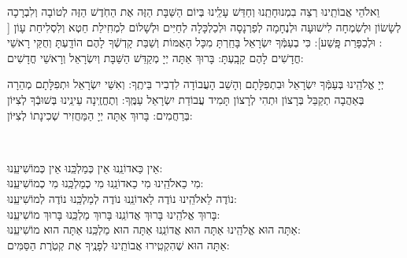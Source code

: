 \documentclass[twoside, openany, parskip=half, 11pt]{book}
\begin{document}
\begin{sometimes}
 וֵאלֹהֵי אֲבוֹתֵֽינוּ רְצֵה בִמְנוּחָתֵֽנוּ וְחַדֵּשׁ עָלֵֽינוּ בְּיוֹם הַשַּׁבָּת הַזֶּה אֶת הַחֹֽדֶשׁ הַזֶּה לְטוֹבָה וְלִבְרָכָה לְשָׂשׂוֹן וּלְשִׂמְחָה לִישׁוּעָה וּלְנֶחָמָה לְפַרְנָסָה וּלְכַלְכָּלָה לְחַיִּים וּלְשָׁלוֹם לִמְחִֽילַת חֵטְא וְלִסְלִיחַת עָוֹן [
: וּלְכַפָּרַת פָּֽשַׁע]: כִּי בְעַמְּֿךָ יִשְׂרָאֵל בָּחַֽרְתָּ מִכָּל הָאֻמּוֹת וְשַׁבַּת קָדְשְֿׁךָ לָהֶם הוֹדָֽעְתָּ וְחֻקֵּי רָאשֵׁי חֳדָשִׁים לָהֶם קָבָֽעְתָּ: בָּרוּךְ אַתָּה יְיָ מְקַדֵּשׁ הַשַּׁבָּת וְיִשְׂרָאֵל וְרָאשֵׁי חֳדָשִׁים: 

\end{sometimes}

 יְיָ אֱלֹהֵֽינוּ בְּעַמְּֿךָ יִשְׂרָאֵל וּבִתְפִלָּתָם וְהָשֵׁב הָעֲבוֹדָה לִדְבִיר בֵּיתֶֽךָ: וְאִשֵּׁי יִשְׂרָאֵל וּתְפִלָּתָם מְהֵרָה בְּאַהֲבָה תְקַבֵּל בְּרָצוֹן וּתְהִי לְרָצוֹן תָּמִיד עֲבוֹדַת יִשְׂרָאֵל עַמֶּֽךָ: וְתֶחֱזֶֽינָה עֵינֵֽינוּ בְּשׁוּבְֿךָ לְצִיּוֹן בְּרַחֲמִים: 
בָּרוּךְ אַתָּה יְיָ הַמַּחֲזִיר שְׁכִינָתוֹ לְצִיּוֹן:

\modim

\clearpage

\shabboschanukah

\shabboshodos

\bircaskohanim

\shabbossimshalom


\tachanunim

 \pageref{hoshanos}\\

\fullkaddish



\label{einkelokeinu}
 \hfill אֵין כַּאדוֹנֵֽנוּ \hfill אֵין כְּמַלְכֵּֽנוּ \hfill אֵין כְּמוֹשִׁיעֵֽנוּ:\\ 
מִי כֵאלֹהֵֽינוּ \hfill	מִי כַאדוֹנֵֽנוּ \hfill	מִי כְמַלְכֵּֽנוּ \hfill	מִי כְמוֹשִׁיעֵֽנוּ:\\ 
נוֹדֶה לֵאלֹהֵֽינוּ \hfill נוֹדֶה לַאדוֹנֵֽנוּ \hfill נוֹדֶה לְמַלְכֵּֽנוּ \hfill נוֹדֶה לְמוֹשִׁיעֵֽנוּ:\\ 
בָּרוּךְ אֱלֹהֵֽינוּ \hfill בָּרוּךְ אֲדוֹנֵֽנוּ \hfill בָּרוּךְ מַלְכֵּֽנוּ \hfill בָּרוּךְ מוֹשִׁיעֵֽנוּ:\\ 
אַתָּה הוּא אֱלֹהֵֽינוּ  אַתָּה הוּא אֲדוֹנֵֽנוּ  אַתָּה הוּא מַלְכֵּֽנוּ  אַתָּה הוּא מוֹשִׁיעֵֽנוּ:\\ 
 אַתָּה הוּא שֶׁהִקְטִֽירוּ אֲבוֹתֵֽינוּ לְפָנֶֽיךָ אֶת קְטֹֽרֶת הַסַּמִּים:
\end{document}
